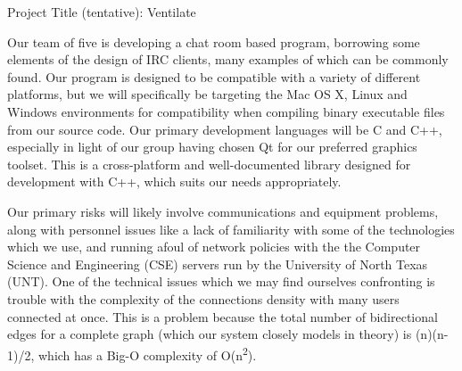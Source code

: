 \documentclass[12pt]{report}
\begin{document}
\begin{flushleft}

\begin{center}
Project Title (tentative): Ventilate
\end{center}

\setlength{\parindent}{1.27cm}

\indent \indent Our team of five is developing a chat room based program, borrowing some elements of the design of IRC clients, many examples of which can be commonly found. Our program is designed to be compatible with a variety of different platforms, but we will specifically be targeting the Mac OS X, Linux and Windows environments for compatibility when compiling binary executable files from our source code. Our primary development languages will be C and C++, especially in light of our group having chosen Qt for our preferred graphics toolset. This is a cross-platform and well-documented library designed for development with C++, which suits our needs appropriately.

\indent Our primary risks will likely involve communications and equipment problems, along with personnel issues like a lack of familiarity with some of the technologies which we use, and running afoul of network policies with the the Computer Science and Engineering (CSE) servers run by the University of North Texas (UNT). One of the technical issues which we may find ourselves confronting is trouble with the complexity of the connections density with many users connected at once. This is a problem because the total number of bidirectional edges for a complete graph (which our system closely models in theory) is (n)(n-1)/2, which has a Big-O complexity of O(n\textsuperscript{2}).


\end{flushleft}
\end{document}
